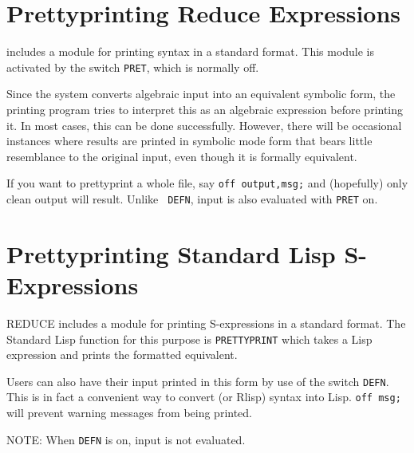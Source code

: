 \section{Prettyprinting Reduce Expressions}

{\REDUCE} includes a module for printing {\REDUCE} syntax in a standard
format.  This module is activated by the switch {\tt PRET},
 which is normally off.

Since the system converts algebraic input into an equivalent symbolic form,
the printing program tries to interpret this as an algebraic expression
before printing it. In most cases, this can be done successfully. However,
there will be occasional instances where results are printed in symbolic
mode form that bears little resemblance to the original input, even though
it is formally equivalent.

If you want to prettyprint a whole file, say {\tt off output,msg;}
 and (hopefully) only clean output will result.  Unlike {\tt
DEFN}, input is also evaluated with {\tt PRET}
 on.

\section{Prettyprinting Standard Lisp S-Expressions}

REDUCE includes a module for printing
S-expressions in a standard format.  The Standard Lisp function for this
purpose is {\tt PRETTYPRINT} which takes a Lisp
expression and prints the formatted equivalent.

Users can also have their {\REDUCE} input printed in this form by use of
the switch {\tt DEFN}. This is in fact a convenient way to
convert {\REDUCE} (or Rlisp) syntax into Lisp. {\tt off msg;} will prevent
warning messages from being printed.

NOTE: When {\tt DEFN} is on, input is not evaluated.

